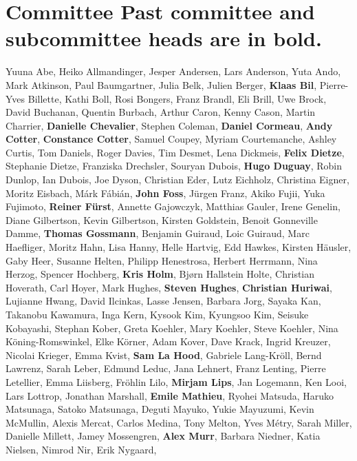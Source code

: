 \section*{Committee \textnormal{\small \quad Past committee and subcommittee heads are in bold.}} %
\vspace{-2pt}
\begingroup
\fontsize{9pt}{9pt}\selectfont
Yuuna Abe,
Heiko Allmandinger,
Jesper Andersen,
Lars Anderson,
Yuta Ando,
Mark Atkinson,
Paul Baumgartner,
Julia Belk,
Julien Berger,
\textbf{Klaas Bil},
Pierre-Yves Billette,
Kathi Boll,
Rosi Bongers,
Franz Brandl,
Eli Brill,
Uwe Brock,
David Buchanan,
Quentin Burbach,
Arthur Caron,
Kenny Cason,
Martin  Charrier,
\textbf{Danielle Chevalier},
Stephen Coleman,
\textbf{Daniel Cormeau},
\textbf{Andy Cotter},
\textbf{Constance Cotter},
Samuel Coupey,
Myriam Courtemanche,
Ashley  Curtis,
Tom Daniels,
Roger Davies,
Tim Desmet,
Lena Dickmeis,
\textbf{Felix Dietze},
Stephanie Dietze,
Franziska Drechsler,
Souryan Dubois,
\textbf{Hugo Duguay},
Robin Dunlop,
Ian Dubois,
Joe Dyson,
Christian Eder,
Lutz Eichholz,
Christina Eigner,
Moritz Eisbach,
Márk  Fábián,
\textbf{John Foss},
Jürgen  Franz,
Akiko Fujii,
Yuka Fujimoto,
\textbf{Reiner Fürst},
Annette Gajowczyk,
Matthias Gauler,
Irene Genelin,
Diane Gilbertson,
Kevin Gilbertson,
Kirsten Goldstein,
Benoit Gonneville Damme,
\textbf{Thomas Gossmann},
Benjamin Guiraud,
Loic Guiraud,
Marc Haefliger,
Moritz Hahn,
Lisa Hanny,
Helle Hartvig,
Edd Hawkes,
Kirsten Häusler,
Gaby Heer,
Susanne Helten,
Philipp Henestrosa,
Herbert Herrmann,
Nina Herzog,
Spencer Hochberg,
\textbf{Kris Holm},
Bjørn Hallstein Holte,
Christian Hoverath,
Carl Hoyer,
Mark Hughes,
\textbf{Steven Hughes},
\textbf{Christian Huriwai},
Lujianne Hwang,
David Ilcinkas,
Lasse Jensen,
Barbara Jorg,
Sayaka Kan,
Takanobu Kawamura,
Inga Kern,
Kysook Kim,
Kyungsoo Kim,
Seisuke Kobayashi,
Stephan Kober,
Greta Koehler,
Mary Koehler,
Steve Koehler,
Nina Köning-Romswinkel,
Elke Körner,
Adam Kover,
Dave Krack,
Ingrid Kreuzer,
Nicolai Krieger,
Emma Kvist,
\textbf{Sam La Hood},
Gabriele Lang-Kröll,
Bernd Lawrenz,
Sarah Leber,
Edmund Leduc,
Jana Lehnert,
Franz Lenting,
Pierre Letellier,
Emma Liisberg,
Fröhlin Lilo,
\textbf{Mirjam  Lips},
Jan Logemann,
Ken Looi,
Lars Lottrop,
Jonathan Marshall,
\textbf{Emile Mathieu},
Ryohei Matsuda,
Haruko Matsunaga,
Satoko Matsunaga,
Deguti Mayuko,
Yukie Mayuzumi,
Kevin McMullin,
Alexis  Mercat,
Carlos Medina,
Tony Melton,
Yves Métry,
Sarah Miller,
Danielle Millett,
Jamey Mossengren,
\textbf{Alex  Murr},
Barbara Niedner,
Katia Nielsen,
Nimrod Nir,
Erik Nygaard,

